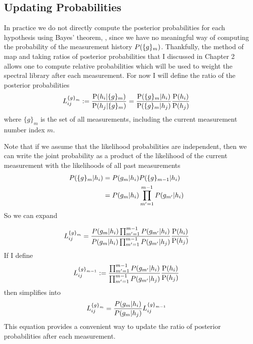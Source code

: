 \subsection{Updating Probabilities}\label{ssec:updatingProbabilities}

In practice we do not directly compute the posterior probabilities for each hypothesis using Bayes' theorem, , since we have no meaningful way of computing the probability of the measurement history $\prob{ \{g\}_m }$. Thankfully, the method of \acrfull{map} and taking ratios of posterior probabilities that I discussed in Chapter 2 allows one to compute relative probabilities which will be used to weight the spectral library after each measurement. For now I will define the ratio of the posterior probabilities
%
\begin{equation}
	  L_{ij}^{\left\{ g \right\}_m} := \pr{h_i | \{g\}_{m} }{h_j | \{g\}_{m} } = \pr{ \{g\}_{m}|h_i }{ \{g\}_{m}|h_j} \pr{h_i}{h_j}
	  \label{eq:initRatio1}
\end{equation}
%
where $\{g\}_{m}$ is the set of all measurements, including the current measurement number index $m$.


Note that if we assume that the likelihood probabilities are independent, then we can write the joint probability as a product of the likelihood of the current measurement with the likelihoods of all past measurements
%
\begin{align}
	\prob{\{g\}_m|h_i} &= \prob{g_m|h_i} \prob{\{g\}_{m-1}|h_i} \notag \\
							&= \prob{g_m|h_i} \prod_{m'=1}^{m-1} \prob{g_{m'}|h_i}
\end{align}
So we can expand  

\begin{equation}
	  L_{ij}^{\left\{ g \right\}_m} =  \frac{ \prob{g_m|h_i} \prod_{m'=1}^{m-1} \prob{g_{m'}|h_i} }{ \prob{g_m|h_i} \prod_{m'=1}^{m-1} \prob{g_{m'}|h_j}} \pr{h_i}{h_j}
	  \label{eq:initRatio2}
\end{equation}
%
If I define
%
\begin{equation}
L_{ij}^{\left\{ g \right\}_{m-1}} := \frac{ \prod_{m'=1}^{m-1} \prob{g_{m'}|h_i} }{ \prod_{m'=1}^{m-1} \prob{g_{m'}|h_j}} \pr{h_i}{h_j}
\end{equation}
%
then  simplifies into
%
\begin{equation}
	  L_{ij}^{\left\{ g \right\}_m} =  \frac{ \prob{g_m| h_i} } { \prob{g_m| h_j} } L_{ij}^{\left\{ g \right\}_{m-1}}
	  \label{eq:initRatio3}
\end{equation}
%
This equation provides a convenient way to update the ratio of posterior probabilities after each measurement.


